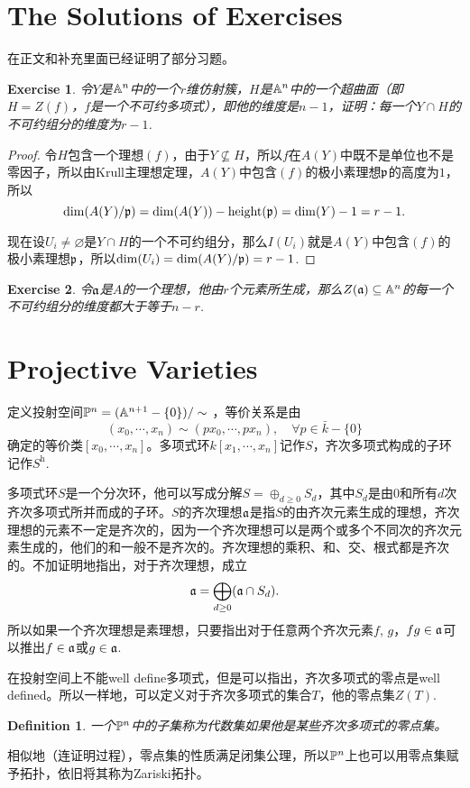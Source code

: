 \documentclass[9pt]{extbook}
\theoremstyle{plain}%
\newtheorem{defi}{Definition}[section]%
\newtheorem{exe}{Exercise}[section]%
\begin{document}
\section*{The Solutions of Exercises}
在正文和补充里面已经证明了部分习题。
\setcounter{exe}{7}
\begin{exe}
令$Y$是$\mathbb{A}^n$中的一个$r$维仿射簇，$H$是$\mathbb{A}^n$中的一个超曲面（即$H=Z(f)$，$f$是一个不可约多项式），即他的维度是$n-1$，证明：每一个$Y\cap H$的不可约组分的维度为$r-1$.
\end{exe}
\begin{proof}
	令$H$包含一个理想$(f)$，由于$Y\nsubseteq H$，所以$f$在$A(Y)$中既不是单位也不是零因子，所以由Krull主理想定理，$A(Y)$中包含$(f)$的极小素理想$\mathfrak{p}$的高度为$1$，所以
	\[
		\dim (A(Y)/\mathfrak{p})=\dim(A(Y))-\operatorname{height}(\mathfrak{p})=\dim(Y)-1=r-1.
	\]

	现在设$U_i\neq \varnothing$是$Y\cap H$的一个不可约组分，那么$I(U_i)$就是$A(Y)$中包含$(f)$的极小素理想$\mathfrak{p}$，所以$\dim (U_i)=\dim (A(Y)/\mathfrak{p})=r-1$.
\end{proof}
\begin{exe}
令$\mathfrak{a}$是$A$的一个理想，他由$r$个元素所生成，那么$Z(\mathfrak{a})\subseteq \mathbb{A}^n$的每一个不可约组分的维度都大于等于$n-r$.
\end{exe}
\section{Projective Varieties}
定义投射空间$\mathbb{P}^n=(\mathbb{A}^{n+1}-\{0\})/\sim$ ，等价关系是由
\[
(x_0,\cdots,x_n)\sim (px_0,\cdots,px_n), \quad \forall p\in \bar{k}-\{0\}
\]
确定的等价类$[x_0,\cdots,x_n]$。多项式环$k[x_1,\cdots ,x_n]$记作$S$，齐次多项式构成的子环记作$S^{\mathrm{h}}$.

多项式环$S$是一个分次环，他可以写成分解$S=\oplus_{d\geq 0} S_d$，其中$S_d$是由$0$和所有$d$次齐次多项式所并而成的子环。$S$的齐次理想$\mathfrak{a}$是指$S$的由齐次元素生成的理想，齐次理想的元素不一定是齐次的，因为一个齐次理想可以是两个或多个不同次的齐次元素生成的，他们的和一般不是齐次的。齐次理想的乘积、和、交、根式都是齐次的。不加证明地指出，对于齐次理想，成立
\[
	\mathfrak{a}=\bigoplus_{d\geq 0} (\mathfrak{a}\cap S_d).
\]
所以如果一个齐次理想是素理想，只要指出对于任意两个齐次元素$f$, $g$，$fg\in \mathfrak{a}$可以推出$f\in \mathfrak{a}$或$g\in \mathfrak{a}$.

在投射空间上不能well define多项式，但是可以指出，齐次多项式的零点是well defined。所以一样地，可以定义对于齐次多项式的集合$T$，他的零点集$Z(T)$.

\begin{defi}
	一个$\mathbb{P}^n$中的子集称为代数集如果他是某些齐次多项式的零点集。
\end{defi}
相似地（连证明过程），零点集的性质满足闭集公理，所以$\mathbb{P}^n$上也可以用零点集赋予拓扑，依旧将其称为Zariski拓扑。
\end{document}
